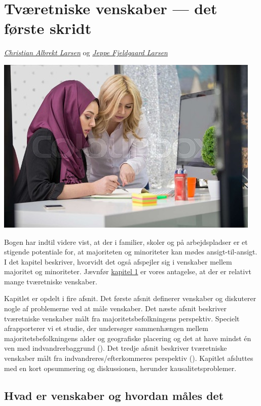 \documentclass[
]{book}
\begin{document}
\chapter{Tværetniske venskaber --- det første skridt}\label{kap6}

\emph{\href{https://vbn.aau.dk/en/persons/albrekt}{Christian Albrekt Larsen}} og \emph{\href{https://vbn.aau.dk/da/persons/jeppefl}{Jeppe Fjeldgaard Larsen}}

\includegraphics[width=1\linewidth]{images/kap6}

Bogen har indtil videre vist, at der i familier, skoler og på arbejdspladser er et stigende potentiale for, at majoriteten og minoriteter kan mødes ansigt-til-ansigt. I det kapitel beskriver, hvorvidt det også afspejler sig i venskaber mellem majoritet og minoriteter. Jævnfør \hyperref[kap1]{kapitel 1} er vores antagelse, at der er relativt mange tværetniske venskaber.

Kapitlet er opdelt i fire afsnit. Det første afsnit definerer venskaber og diskuterer nogle af problemerne ved at måle venskaber. Det næste afsnit beskriver tværetniske venskaber målt fra majoritetsbefolkningens perspektiv. Specielt afrapporterer vi et studie, der undersøger sammenhængen mellem majoritetsbefolkningens alder og geografiske placering og det at have mindst én ven med indvandrerbaggrund (). Det tredje afsnit beskriver tværetniske venskaber målt fra indvandreres/efterkommeres perspektiv (). Kapitlet afsluttes med en kort opsummering og diskussionen, herunder kausalitetsproblemer.

\section{Hvad er venskaber og hvordan måles det}\label{hvad-er-venskaber-og-hvordan-muxe5les-det}
\end{document}
